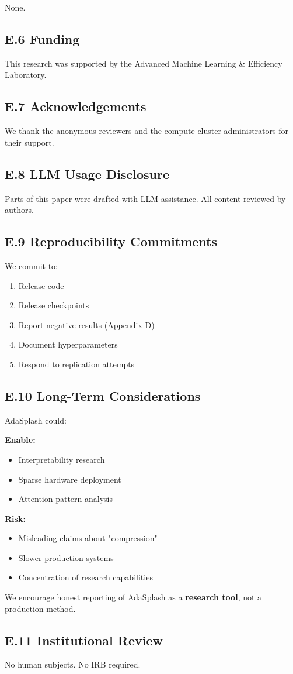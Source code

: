 None.

\subsection{E.6 Funding}

This research was supported by the Advanced Machine Learning \& Efficiency Laboratory.

\subsection{E.7 Acknowledgements}

We thank the anonymous reviewers and the compute cluster administrators for their support.

\subsection{E.8 LLM Usage Disclosure}

Parts of this paper were drafted with LLM assistance. All content reviewed 
by authors.

\subsection{E.9 Reproducibility Commitments}

We commit to:
\begin{enumerate}
\item Release code
\item Release checkpoints
\item Report negative results (Appendix D)
\item Document hyperparameters
\item Respond to replication attempts

\end{enumerate}
\subsection{E.10 Long-Term Considerations}

AdaSplash could:

\textbf{Enable:}
\begin{itemize}
\item Interpretability research
\item Sparse hardware deployment
\item Attention pattern analysis

\end{itemize}
\textbf{Risk:}
\begin{itemize}
\item Misleading claims about "compression"
\item Slower production systems
\item Concentration of research capabilities

\end{itemize}
We encourage honest reporting of AdaSplash as a \textbf{research tool}, not a 
production method.

\subsection{E.11 Institutional Review}

No human subjects. No IRB required.